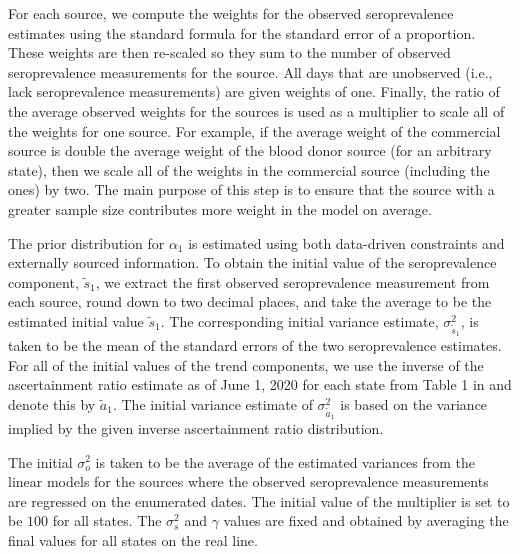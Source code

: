 \documentclass{article}
\begin{document}
For each source, we compute the weights for the observed seroprevalence
estimates using the standard formula for the standard error of a proportion.
These weights are then re-scaled so they sum to the number of observed
seroprevalence measurements for the source. All days that are unobserved (i.e.,
lack seroprevalence measurements) are given weights of one. Finally, the ratio
of the average observed weights for the sources is used as a multiplier to scale
all of the weights for one source. For example, if the average weight of the
commercial source is double the average weight of the blood donor source (for an
arbitrary state), then we scale all of the weights in the commercial source
(including the ones) by two. The main purpose of this step is to ensure that
the source with a greater sample size contributes more weight in the model on
average. %

The prior distribution for $\alpha_1$ is estimated using both data-driven constraints 
and externally sourced information. To obtain the initial value of the seroprevalence 
component, $\tilde{s}_{1}$, we extract the first observed seroprevalence measurement from 
each source, round down to two decimal places, and take the average to be the
estimated initial value $\tilde{s}_{1}$. The corresponding initial
variance estimate, $\sigma^2_{\tilde{s}_{1}}$, is taken to be the mean of the standard
errors of the two seroprevalence estimates. For all of the initial values of the trend 
components, we use the inverse of the ascertainment ratio estimate as of June 1, 2020 
for each state from Table 1 in \citet{unwin2020state} and denote this by $\tilde{a}_1$. The
initial variance estimate of $\sigma^2_{\tilde{a}_1}$ is based on the variance implied 
by the given inverse ascertainment ratio distribution.

The initial $\sigma^2_o$ is taken to be the average of the estimated variances
from the linear models for the sources where the observed seroprevalence
measurements are regressed on the enumerated dates. The initial value of 
the multiplier is set to be $100$ for all states. The $\sigma^2_s$ and $\gamma$ 
values are fixed and obtained by averaging the final values for all states on the real line. 
\end{document}
